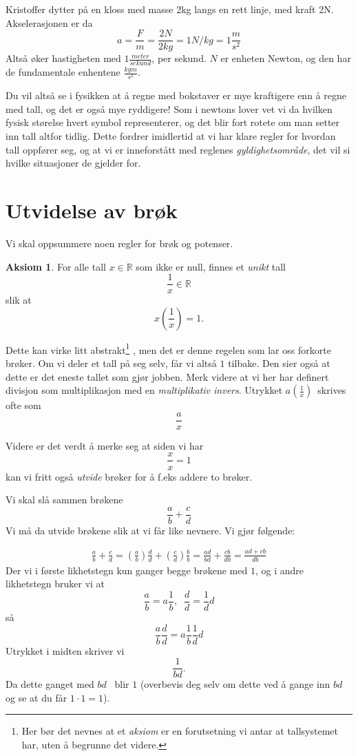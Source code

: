 \documentclass[11pt]{article}
\theoremstyle{definition}
\newtheorem{aksiom}[theorem]{Aksiom}
\theoremstyle{definition}
\newcommand{\R}{\mathbb{R}}
\begin{document}
\begin{eksempel} 
Kristoffer dytter på en kloss med masse 2kg langs en rett linje, med
kraft 2N. Akselerasjonen er da \[a = \frac{F}{m} = \frac{2N}{2kg} = 1N/kg = 1
\frac{m}{s^2}\]
Altså øker hastigheten med $1\frac{meter}{sekund}$, per sekund.
$N$ er enheten Newton, og den har de fundamentale enhentene $\frac{kg m}{s^2}$.
\end{eksempel} 

Du vil altså se i fysikken at å regne med bokstaver er mye kraftigere enn
å regne med tall, og det er også mye ryddigere! Som i newtons lover
vet vi da hvilken fysisk størelse hvert symbol representerer, og det
blir fort rotete om man setter inn tall altfor tidlig. Dette fordrer imidlertid
at vi har klare regler for hvordan tall oppfører seg, og at vi er inneforstått
med reglenes \emph{gyldighetsområde}, det vil si hvilke situasjoner de gjelder
for.

\section{Utvidelse av brøk}
Vi skal oppsummere noen regler for brøk og potenser.

\begin{aksiom}
For alle tall $x\in \R$ som ikke er null, finnes et \emph{unikt}
tall \[\frac{1}{x} \in \R \]
slik at \[ x\left(\frac{1}{x}\right) = 1.\]
\end{aksiom}
Dette kan virke litt abstrakt\footnote{
    Her bør det nevnes at et \emph{aksiom} er en forutsetning vi antar at
        tallsystemet har, uten å begrunne det videre.}
        , men det er denne
regelen som lar oss forkorte brøker. Om vi deler et tall på
seg selv, får vi altså $1$ tilbake. Den sier også at dette er
det eneste tallet som gjør jobben. Merk videre at vi her har
definert divisjon som multiplikasjon med en \emph{multiplikativ invers}.
Utrykket $a(\frac{1}{x})$ skrives ofte som
\[\frac{a}{x}\]

Videre er det verdt å merke seg at siden vi har 
\[\frac{x}{x} = 1 \] kan vi fritt også \emph{utvide}
brøker for å f.eks addere to brøker.
\begin{eksempel}
Vi skal slå sammen brøkene \[\frac{a}{b} + \frac{c}{d}\]
Vi må da utvide brøkene slik at vi får like nevnere. Vi gjør
følgende:

\begin{align}\label{brokutvidelse}
\frac{a}{b} + \frac{c}{d} = 
\left(\frac{a}{b}\right)\frac{d}{d} + \left(\frac{c}{d}\right)\frac{b}{b}
        = \frac{ad}{bd} + \frac{cb}{db} = \frac{ad + cb}{db}
\end{align}
Der vi i første likhetstegn kun ganger begge brøkene med $1$, og i andre
likhetstegn bruker vi at 
\[\frac{a}{b} = a\frac{1}{b},\;\; \frac{d}{d} = \frac{1}{d}d\]
så
\[\frac{a}{b}\frac{d}{d} = a\frac{1}{b}\frac{1}{d}d\]
Utrykket i midten skriver vi \[\frac{1}{bd}.\]
Da dette ganget med $bd$  blir $1$ (overbevis deg selv om dette
        ved å gange inn $bd$ og se at du får $1\cdot 1 = 1$).

\end{eksempel}
\end{document}

